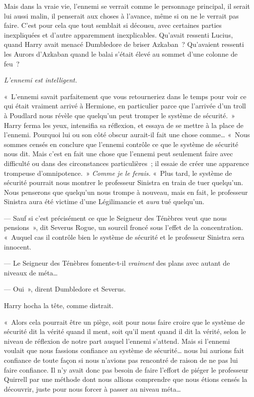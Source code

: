 Mais dans la vraie vie, l'ennemi se verrait comme le personnage principal, il serait lui aussi malin, il penserait aux choses à l'avance, même si on ne le verrait pas faire.
C'est pour cela que tout semblait si décousu, avec certaines parties inexpliquées et d'autre apparemment inexplicables.
Qu'avait ressenti Lucius, quand Harry avait menacé Dumbledore de briser Azkaban~?
Qu'avaient ressenti les Aurors d'Azkaban quand le balai s'était élevé au sommet d'une colonne de feu~?

\emph{L'ennemi est intelligent.}

«~L'ennemi savait parfaitement que vous retourneriez dans le temps pour voir ce qui était vraiment arrivé à Hermione, en particulier parce que l'arrivée d'un troll à Poudlard nous révèle que quelqu'un peut tromper le système de sécurité.~»
Harry ferma les yeux, intensifia sa réflexion, et essaya de se mettre à la place de l'ennemi.
Pourquoi lui ou son côté obscur aurait-il fait une chose comme…
«~Nous sommes censés en conclure que l'ennemi contrôle ce que le système de sécurité nous dit.
Mais c'est en fait une chose que l'ennemi peut seulement faire avec difficulté ou dans des circonstances particulières~; il essaie de créer une apparence trompeuse d'omnipotence.~»
\emph{Comme je le ferais.} «~Plus tard, le système de sécurité pourrait nous montrer le professeur Sinistra en train de tuer quelqu'un.
Nous penserons que quelqu'un nous trompe à nouveau, mais en fait, le professeur Sinistra aura été victime d'une Légilimancie et \emph{aura} tué quelqu'un.

--- Sauf si c'est précisément ce que le Seigneur des Ténèbres veut que nous pensions~», dit Severus Rogue, un sourcil froncé sous l'effet de la concentration.
«~Auquel cas il contrôle bien le système de sécurité et le professeur Sinistra sera innocent.

--- Le Seigneur des Ténèbres fomente-t-il \emph{vraiment} des plans avec autant de niveaux de méta…

--- Oui~», dirent Dumbledore et Severus.

Harry hocha la tête, comme distrait.

«~Alors cela pourrait être un piège, soit pour nous faire croire que le système de sécurité dit la vérité quand il ment, soit qu'il ment quand il dit la vérité, selon le niveau de réflexion de notre part auquel l'ennemi s'attend.
Mais si l'ennemi voulait que nous fassions confiance au système de sécurité… nous lui aurions fait confiance de toute façon si nous n'avions pas rencontré de raison de ne pas lui faire confiance.
Il n'y avait donc pas besoin de faire l'effort de piéger le professeur Quirrell par une méthode dont nous allions comprendre que nous étions censés la découvrir, juste pour nous forcer à passer au niveau méta…

